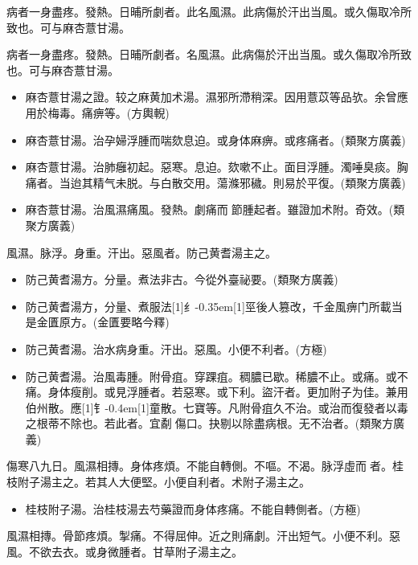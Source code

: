 \documentclass[11pt,oneside,b5paper]{ctexbook}
\begin{document}
\begin{flushleft}
病者一身盡疼。發熱。日晡所劇者。此名風濕。此病傷於汗出当風。或久傷取冷所致也。可与麻杏薏甘湯。

病者一身盡疼。發熱。日晡所劇者。名風濕。此病傷於汗出当風。或久傷取冷所致也。可与麻杏薏甘湯。

\begin{itemize}
\item 麻杏薏甘湯之證。较之麻黄加术湯。濕邪所滯稍深。因用薏苡等品欤。余曾應用於梅毒。痛痹等。(方輿輗)
\item 麻杏薏甘湯。治孕婦浮腫而喘欬息迫。或身体麻痹。或疼痛者。(類聚方廣義)
\item 麻杏薏甘湯。治肺癰初起。惡寒。息迫。欬嗽不止。面目浮腫。濁唾臭痰。胸痛者。当迨其精气未脱。与白散交用。蕩滌邪穢。則易於平復。(類聚方廣義)
\item 麻杏薏甘湯。治風濕痛風。發熱。劇痛而{𬮦}節腫起者。雖證加术附。奇效。(類聚方廣義)
\end{itemize}

風濕。脉浮。身重。汗出。惡風者。防己黄耆湯主之。

\begin{itemize}
\item 防己黄耆湯方。分量。煮法非古。今從外臺祕要。(類聚方廣義)
\item 防己黄耆湯方，分量、煮服法{\hbox{\scalebox{0.68}[1]{纟}\kern-0.35em\scalebox{0.64}[1]{巠}}}後人篡改，千金風痹门所載当是金匱原方。(金匱要略今釋)
\item 防己黄耆湯。治水病身重。汗出。惡風。小便不利者。(方極)
\item 防己黄耆湯。治風毒腫。附骨疽。穿踝疽。稠膿已歇。稀膿不止。或痛。或不痛。身体瘦削。或見浮腫者。若惡寒。或下利。盜汗者。更加附子为佳。兼用伯州散。應{\hbox{\scalebox{0.7}[1]{钅}\kern-0.4em\scalebox{0.7}[1]{童}}}散。七寶等。凡附骨疽久不治。或治而復發者以毒之根蒂不除也。若此者。宜劀{𫔭}傷口。抉剔以除盡病根。无不治者。(類聚方廣義)
\end{itemize}

傷寒八九日。風濕相摶。身体疼煩。不能自轉側。不嘔。不渴。脉浮虛而{𬈧}者。桂枝附子湯主之。若其人大便堅。小便自利者。术附子湯主之。

\begin{itemize}
\item 桂枝附子湯。治桂枝湯去芍藥證而身体疼痛。不能自轉側者。(方極)
\end{itemize}

風濕相摶。骨節疼煩。掣痛。不得屈伸。近之則痛劇。汗出短气。小便不利。惡風。不欲去衣。或身微腫者。甘草附子湯主之。


\end{flushleft}
\end{document}
